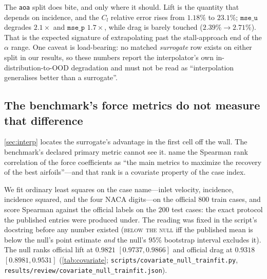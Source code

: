 The \texttt{aoa} split does bite, and only where it should. Lift is the quantity that
depends on incidence, and the $C_l$ relative error rises from $1.18\%$ to
$\mathbf{23.1\%}$; $\texttt{mse\_u}$ degrades $2.1\times$ and $\texttt{mse\_p}$
$1.7\times$, while drag is barely touched ($2.39\%\to2.71\%$). That is the expected
signature of extrapolating past the stall-approach end of the $\alpha$ range. One
caveat is load-bearing: no matched \emph{surrogate} row exists on either split in our
results, so these numbers report the interpolator's own in-distribution-to-OOD
degradation and must not be read as ``interpolation generalises better than a
surrogate''.



\subsection{The benchmark's force metrics do not measure that difference}
\label{sec:covariate}

\autoref{sec:interp} locates the surrogate's advantage in the first cell off the wall.
The benchmark's declared primary metric cannot see it. \citet{bonnet2022airfrans} name
the Spearman rank correlation of the force coefficients as ``the main metrics to
maximize the recovery of the best airfoils''---and that rank is a covariate property of
the case index.

We fit ordinary least squares on the case name---inlet velocity, incidence, incidence
squared, and the four NACA digits---on the official $800$ train cases, and score
Spearman against the official labels on the $200$ test cases: the exact protocol the
published entries were produced under. The reading was fixed in the script's docstring
before any number existed (\textsc{below the null} iff the published mean is below the
null's point estimate \emph{and} the null's $95\%$ bootstrap interval excludes it).
The null ranks official lift at $\mathbf{0.9821}$ $[0.9737,0.9866]$ and official drag
at $\mathbf{0.9318}$ $[0.8981,0.9531]$ (\autoref{tab:covariate};
\texttt{scripts/covariate\_null\_trainfit.py},
\texttt{results/review/covariate\_null\_trainfit.json}).

